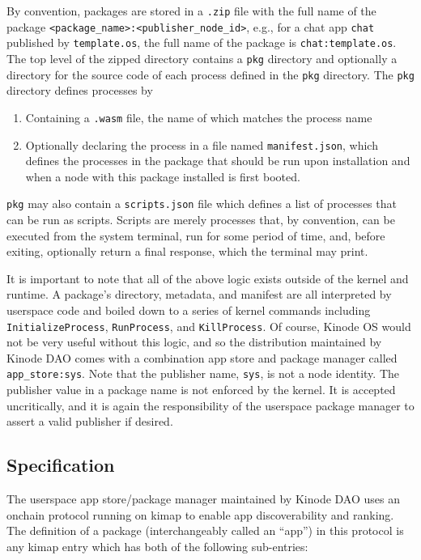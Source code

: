 \documentclass[runningheads]{llncs}
\begin{document}
By convention, packages are stored in a \verb|.zip| file with the full name of the package \verb|<package_name>:<publisher_node_id>|, e.g., for a chat app \verb|chat| published by \verb|template.os|, the full name of the package is \verb|chat:template.os|.
The top level of the zipped directory contains a \verb|pkg| directory and optionally a directory for the source code of each process defined in the \verb|pkg| directory.
The \verb|pkg| directory defines processes by
\begin{enumerate}
    \item Containing a \verb|.wasm| file, the name of which matches the process name
    \item Optionally declaring the process in a file named \verb|manifest.json|, which defines the processes in the package that should be run upon installation and when a node with this package installed is first booted.
\end{enumerate}

\verb|pkg| may also contain a \verb|scripts.json| file which defines a list of processes that can be run as scripts.
Scripts are merely processes that, by convention, can be executed from the system terminal, run for some period of time, and, before exiting, optionally return a final response, which the terminal may print.

It is important to note that all of the above logic exists outside of the kernel and runtime.
A package's directory, metadata, and manifest are all interpreted by userspace code and boiled down to a series of kernel commands including \verb|InitializeProcess|, \verb|RunProcess|, and \verb|KillProcess|.
Of course, Kinode OS would not be very useful without this logic, and so the distribution maintained by Kinode DAO comes with a combination app store and package manager called \verb|app_store:sys|.
Note that the publisher name, \verb|sys|, is not a node identity.
The publisher value in a package name is not enforced by the kernel.
It is accepted uncritically, and it is again the responsibility of the userspace package manager to assert a valid publisher if desired.

\subsection{Specification}
\label{sec:packagemanagerspec}

The userspace app store/package manager maintained by Kinode DAO uses an onchain protocol running on kimap to enable app discoverability and ranking.
The definition of a package (interchangeably called an ``app'') in this protocol is any kimap entry which has both of the following sub-entries:
\end{document}
